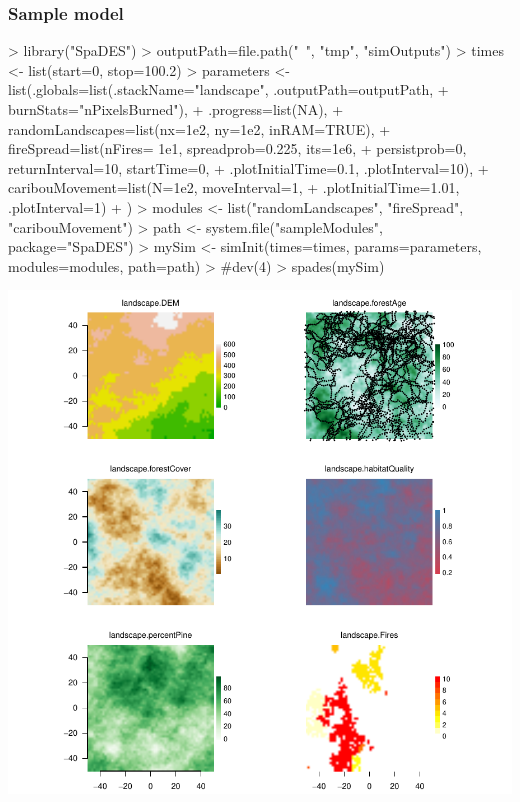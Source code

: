 \documentclass{article}
\begin{document}
\newpage

\subsubsection{Sample model}

\begin{Schunk}
\begin{Sinput}
> library("SpaDES")
> outputPath=file.path("~", "tmp", "simOutputs")
> times <- list(start=0, stop=100.2)
> parameters <- list(.globals=list(.stackName="landscape", .outputPath=outputPath,
+                                  burnStats="nPixelsBurned"),
+                    .progress=list(NA),
+                    randomLandscapes=list(nx=1e2, ny=1e2, inRAM=TRUE),
+                    fireSpread=list(nFires= 1e1, spreadprob=0.225, its=1e6,
+                                    persistprob=0, returnInterval=10, startTime=0,
+                                   .plotInitialTime=0.1, .plotInterval=10),
+                    caribouMovement=list(N=1e2, moveInterval=1,
+                                         .plotInitialTime=1.01, .plotInterval=1)
+                    )
> modules <- list("randomLandscapes", "fireSpread", "caribouMovement")
> path <- system.file("sampleModules", package="SpaDES")
> mySim <- simInit(times=times, params=parameters, modules=modules, path=path)
> #dev(4)
> spades(mySim)
\end{Sinput}
\end{Schunk}
\includegraphics{introduction-using-SpaDES}
\end{document}
